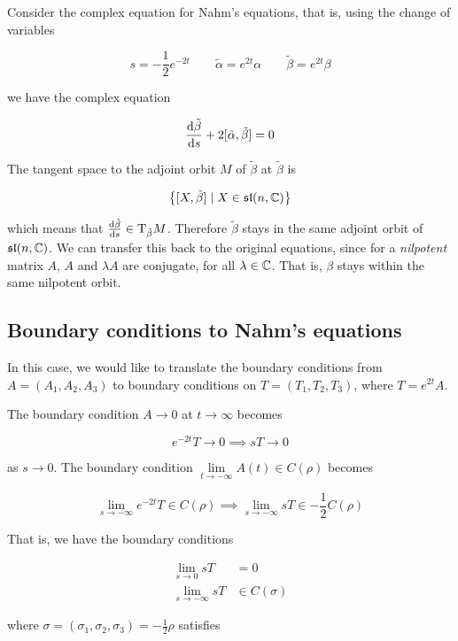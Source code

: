 \documentclass{report}
\renewcommand{\sl}{\mathfrak{sl}}
\begin{document}
Consider the complex equation for Nahm's equations, that is, using the change of variables

\[s = -\frac12e^{-2t} \qquad \tilde\alpha = e^{2t}\alpha \qquad \tilde\beta = e^{2t}\beta\]

we have the complex equation

\[\dv{\tilde\beta}{s} + 2[\tilde\alpha, \tilde \beta] = 0\]

The tangent space to the adjoint orbit \(M\) of \(\tilde\beta\) at \(\tilde\beta\) is

\[\left\{[X, \tilde\beta] \mid X \in \sl(n, \C)\right\}\]

which means that \(\dv{\tilde{\beta}}{s} \in \mathrm{T}_{\tilde\beta}M\). Therefore \(\tilde\beta\) stays in the same adjoint orbit of \(\sl(n, \C)\). We can transfer this back to the original equations, since for a \emph{nilpotent} matrix \(A\), \(A\) and \(\lambda A\) are conjugate, for all \(\lambda \in \mathbb{C}\). That is, \(\beta\) stays within the same nilpotent orbit.

\subsection{Boundary conditions to Nahm's equations}

\label{subsec:nahm-boundary-conditions}

In this case, we would like to translate the boundary conditions from \(A = (A_1, A_2, A_3)\) to boundary conditions on \(T = (T_1, T_2, T_3)\), where \(T = e^{2t}A\).

The boundary condition \(A \to 0\) at \(t \to \infty\) becomes

\[e^{-2t}T \to 0 \implies sT \to 0\]

as \(s \to 0\). The boundary condition \(\lim\limits_{t \to -\infty}A(t) \in C(\rho)\) becomes

\[\lim_{s \to -\infty}e^{-2t}T \in C(\rho) \implies \lim_{s \to -\infty}sT \in -\frac12 C(\rho)\]

That is, we have the boundary conditions

\begin{equation}
    \label{eq:nahm-boundary-conditions}
    \begin{split}
        \lim_{s \to 0} s T &= 0 \\
        \lim_{s \to -\infty}sT &\in C(\sigma)
    \end{split}
\end{equation}

where \(\sigma = (\sigma_1, \sigma_2, \sigma_3) = -\frac12\rho\) satisfies
\end{document}
